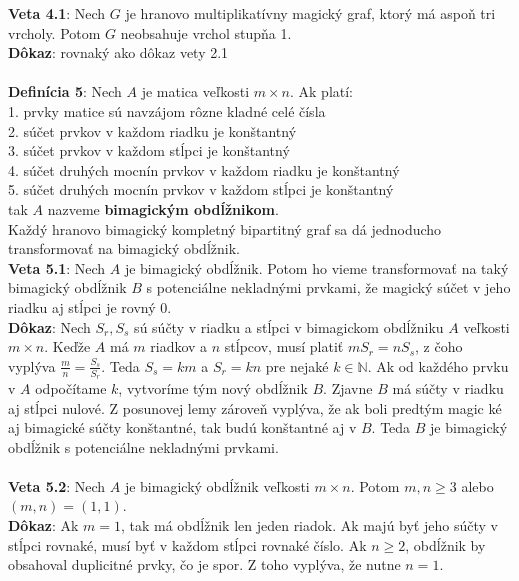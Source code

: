 \documentclass[12pt]{article}
\begin{document}
\textbf{Veta 4.1}: Nech $G$ je hranovo multiplikatívny magický graf, ktorý má aspoň tri vrcholy. Potom $G$ neobsahuje vrchol stupňa 1. \\

\textbf{Dôkaz}: rovnaký ako dôkaz vety 2.1 \\\\

\textbf{Definícia 5}: Nech $A$ je matica veľkosti $m \times n$. Ak platí: \\
1. prvky matice sú navzájom rôzne kladné celé čísla \\
2. súčet prvkov v každom riadku je konštantný \\
3. súčet prvkov v každom stĺpci je konštantný \\
4. súčet druhých mocnín prvkov v každom riadku je konštantný \\
5. súčet druhých mocnín prvkov v každom stĺpci je konštantný \\
tak $A$ nazveme \textbf{bimagickým obdĺžnikom}. \\

Každý hranovo bimagický kompletný bipartitný graf sa dá jednoducho transformovať na bimagický obdĺžnik. \\

\textbf{Veta 5.1}: Nech $A$ je bimagický obdĺžnik. Potom ho vieme transformovať na taký bimagický obdĺžnik $B$ s potenciálne nekladnými prvkami, že magický súčet v jeho riadku aj stĺpci je rovný $0$. \\

\textbf{Dôkaz}: Nech $S_r, S_s$ sú súčty v riadku a stĺpci v bimagickom obdĺžniku $A$ veľkosti $m \times n$. Keďže $A$ má $m$ riadkov a $n$ stĺpcov, musí platiť $m S_r = n S_s$, z čoho vyplýva $\frac{m}{n} = \frac{S_s}{S_r}$. Teda $S_s = km$ a $S_r = kn$ pre nejaké $k \in \mathbb{N}$. Ak od každého prvku v $A$ odpočítame $k$, vytvoríme tým nový obdĺžnik $B$. Zjavne $B$ má súčty v riadku aj stĺpci nulové. Z posunovej lemy zároveň vyplýva, že ak boli predtým magic ké aj bimagické súčty konštantné, tak budú konštantné aj v $B$. Teda $B$ je bimagický obdĺžnik s potenciálne nekladnými prvkami. \\\\

\textbf{Veta 5.2}: Nech $A$ je bimagický obdĺžnik veľkosti $m \times n$. Potom $m,n \geq 3$ alebo $(m, n) = (1, 1)$. \\

\textbf{Dôkaz}: Ak $m = 1$, tak má obdĺžnik len jeden riadok. Ak majú byť jeho súčty v stĺpci rovnaké, musí byť v každom stĺpci rovnaké číslo. Ak $n \geq 2$, obdĺžnik by obsahoval duplicitné prvky, čo je spor. Z toho vyplýva, že nutne $n = 1$. \\
\end{document}
